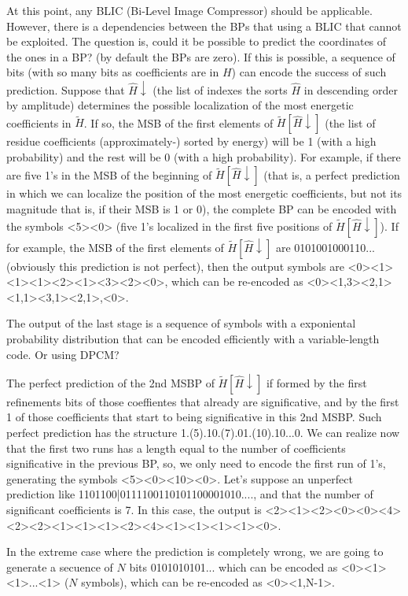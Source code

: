 At this point, any BLIC (Bi-Level Image Compressor) should be
applicable. However, there is a dependencies between the BPs that
using a BLIC that cannot be exploited. The question is, could it be
possible to predict the coordinates of the ones in a BP? (by default
the BPs are zero). If this is possible, a sequence of bits (with so
many bits as coefficients are in $H$) can encode the success of such
prediction. Suppose that $\hat{H}\downarrow$ (the list of indexes the
sorts $\hat{H}$ in descending order by amplitude) determines the
possible localization of the most energetic coefficients in
$\tilde{H}$. If so, the MSB of the first elements of
$\tilde{H}[\hat{H}\downarrow]$ (the list of residue coefficients
(approximately-) sorted by energy) will be 1 (with a high probability)
and the rest will be 0 (with a high probability). For example, if
there are five 1's in the MSB of the beginning of
$\tilde{H}[\hat{H}\downarrow]$ (that is, a perfect prediction in which
we can localize the position of the most energetic coefficients, but
not its magnitude that is, if their MSB is 1 or 0), the complete BP
can be encoded with the symbols <5><0> (five 1's localized in the
first five positions of $\tilde{H}[\hat{H}\downarrow]$). If for
example, the MSB of the first elements of
$\tilde{H}[\hat{H}\downarrow]$ are 0101001000110... (obviously this
prediction is not perfect), then the output symbols are
<0><1><1><1><2><1><3><2><0>, which can be re-encoded as
<0><1,3><2,1><1,1><3,1><2,1>,<0>.

The output of the last stage is a sequence of symbols with a
exponiental probability distribution that can be encoded efficiently
with a variable-length code. Or using DPCM?

The perfect prediction of the 2nd MSBP of
$\tilde{H}[\hat{H}\downarrow]$ if formed by the first refinements bits
of those coeffientes that already are significative, and by the first
1 of those coefficients that start to being significative in this 2nd
MSBP. Such perfect prediction has the structure
1.(5).10.(7).01.(10).10...0. We can realize now that the first two
runs has a length equal to the number of coefficients significative in
the previous BP, so, we only need to encode the first run of 1's,
generating the symbols <5><0><10><0>. Let's suppose an unperfect
prediction like 1101100|0111100110101100001010...., and that the
number of significant coefficients is 7. In this case, the output is
<2><1><2><0><0><4><2><2><1><1><1><2><4><1><1><1><1><0>.

In the extreme case where the prediction is completely wrong, we are
going to generate a secuence of $N$ bits 0101010101... which can be
encoded as <0><1><1>...<1> ($N$ symbols), which can be re-encoded as
<0><1,N-1>.

